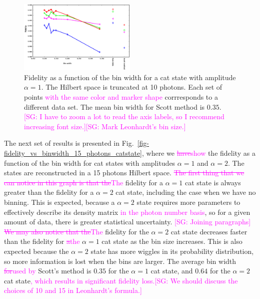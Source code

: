 \documentclass[
reprint,
superscriptaddress,
showpacs,
amsmath,
amssymb,
aps,
pra,
longbibliography
]{revtex4-1}
\providecommand{\aucmnt}[1]{#1}
\providecommand{\editcolor}[2]{\textcolor{#1}{#2}}
\providecommand{\aucmnt}[1]{}
\providecommand{\editcolor}[2]{#2}
\newcommand{\SG}[1]{\editcolor{magenta}{#1}}
\newcommand{\SGs}[1]{\aucmnt{\editcolor{magenta}{\sout{#1}}}}
\newcommand{\SGc}[1]{\aucmnt{\editcolor{magenta}{[SG: #1]}}}
\begin{document}
\begin{figure}
  \includegraphics[width=0.5\textwidth]{methods_fidelity_singledata.eps}
  \caption{Fidelity as a function of the bin width for a cat state
    with amplitude $\alpha=1$. The Hilbert space is truncated at 10
    photons. Each set of points \SG{with the same color and marker
      shape} corrresponds to a different data set. The mean bin width
    for Scott method is $0.35$. \SGc{I have to zoom a lot to read the
      axis labels, so I recommend increasing font size.}\SGc{Mark
      Leonhardt's bin size.}}
  \label{fig-methods_fidelity_singledata}
\end{figure}



The next set of results is presented in
Fig.~\ref{fig-fidelity_vs_binwidth_15_photons_catstate}, where we
\SGs{have}\SG{show} the fidelity as a function of the bin width for
cat states with amplitudes $\alpha=1$ and $\alpha=2$. The states are
reconstructed in a 15 photons Hilbert space. \SGs{The first thing that
  we can notice in this graph is that the}\SG{The} fidelity for a
$\alpha=1$ cat state is always greater than the fidelity for a
$\alpha=2$ cat state, including the case when we have no binning. This
is expected, because a $\alpha = 2$ state requires more parameters to
effectively describe its density matrix \SG{in the photon number
  basis}, so for a given amount of data, there is greater statistical
uncertainty. \SGc{Joining paragraphs} \SGs{We may also notice that
  the}\SG{The} fidelity for the $\alpha = 2$ cat state decreases
faster than the fidelity for \SGs{a}\SG{the} $\alpha=1$ cat state as
the bin size increases. This is also expected because the $\alpha = 2$
state has more wiggles in its probability distribution, so more
information is lost when the bins are larger. The average bin width
\SGs{for}\SG{used by} Scott's method is $0.35$ for the $\alpha=1$ cat
state, and $0.64$ for the $\alpha=2$ cat state\SG{, which results in
  significant fidelity loss.}\SGc{We should discuss the choices of 10 and 15 in Leonhardt's formula.}
\end{document}

